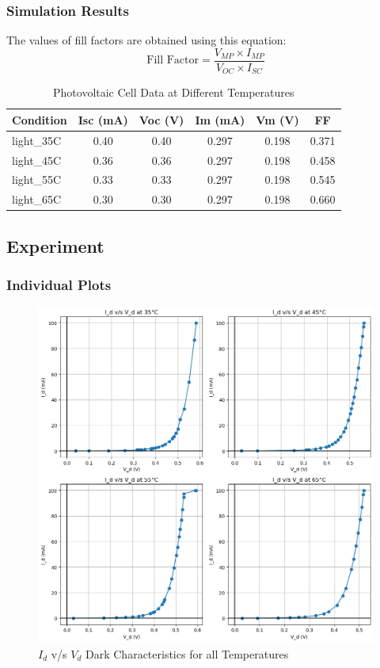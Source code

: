 \documentclass[a4paper]{article}
\begin{document}
\subsubsection{Simulation Results}
The values of fill factors are obtained using this equation:
\[
\text{Fill Factor} = \frac{V_{MP} \times I_{MP}}{V_{OC} \times I_{SC}}
\]
\begin{table}[h!]
    \centering
    \caption{Photovoltaic Cell Data at Different Temperatures}
    \begin{tabular}{|l|c|c|c|c|c|}
        \hline
        \textbf{Condition} & \textbf{Isc (mA)} & \textbf{Voc (V)} & \textbf{Im (mA)} & \textbf{Vm (V)} & \textbf{FF} \\ \hline
        light\_35C & 0.40 & 0.40 & 0.297 & 0.198 & 0.371 \\ \hline
        light\_45C & 0.36 & 0.36 & 0.297 & 0.198 & 0.458 \\ \hline
        light\_55C & 0.33 & 0.33 & 0.297 & 0.198 & 0.545 \\ \hline
        light\_65C & 0.30 & 0.30 & 0.297 & 0.198 & 0.660 \\ \hline
    \end{tabular}
\end{table}

\subsection{Experiment}

\subsubsection{Individual Plots}
\begin{figure}[h!]
    \centering
    \includegraphics[width=1\linewidth]{Lab_5/Post_Lab/I_d_vs_V_d_Exp_1_Summarised.png}
    \caption{$I_d$ v/s $V_d$ Dark Characteristics for all Temperatures}
\end{figure}
\end{document}
